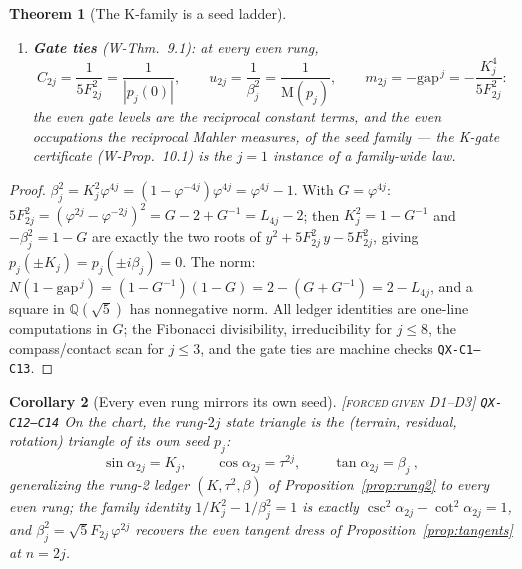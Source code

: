 \documentclass[11pt]{article}
\newcommand{\tagFD}{\textcolor{cF}{\textsc{[forced}}\,\textcolor{cD}{\textsc{given D1--D3]}}}
\newcommand{\hx}[1]{\textcolor{cC}{\footnotesize\texttt{#1}}}
\newcommand{\Q}{\mathbb{Q}}
\newcommand{\gp}{\varphi}
\newcommand{\gapc}{\mathrm{gap}}
\newcommand{\M}{\mathrm{M}}
\theoremstyle{plain}
\newtheorem{theorem}{Theorem}[section]
\newtheorem{corollary}[theorem]{Corollary}
\theoremstyle{definition}
\theoremstyle{remark}
\begin{document}
\begin{theorem}[The K-family is a seed ladder]
\begin{enumerate}[nosep,label=(\alph*)]
$\{\Phi_1^4,\Phi_2^4\}$ (the eight cross-shell ratios have modulus
$(K_j/\beta_j)^{\pm1}\ne1$); and $\M(p_j)=\beta_j^2$: every $p_j$ is a
straddler, real pair strictly inside the unit circle, imaginary pair
strictly outside. (The K-seed's own catalog status is
Proposition~\ref{prop:kseedcat}; the $p_j$, $j\ge2$, are new catalog
objects, and no uniqueness is claimed for them here.)
\item \textbf{Gate ties} (W-Thm.\ 9.1): at every even rung,
\[
C_{2j}=\frac1{5F_{2j}^2}=\frac1{|p_j(0)|},
\qquad
u_{2j}=\frac1{\beta_j^2}=\frac1{\M(p_j)},
\qquad
m_{2j}=-\gapc^{\,j}=-\frac{K_j^4}{5F_{2j}^2}:
\]
the even gate levels are the reciprocal constant terms, and the even
occupations the reciprocal Mahler measures, of the seed family --- the
K-gate certificate (W-Prop.\ 10.1) is the $j=1$ instance of a family-wide
law.
\end{enumerate}
\end{theorem}

\begin{proof}
$\beta_j^2=K_j^2\gp^{4j}=(1-\gp^{-4j})\gp^{4j}=\gp^{4j}-1$. With
$G=\gp^{4j}$: $5F_{2j}^2=(\gp^{2j}-\gp^{-2j})^2=G-2+G^{-1}=L_{4j}-2$;
then $K_j^2=1-G^{-1}$ and $-\beta_j^2=1-G$ are exactly the two roots of
$y^2+5F_{2j}^2\,y-5F_{2j}^2$, giving $p_j(\pm K_j)=p_j(\pm i\beta_j)=0$.
The norm: $N(1-\gapc^{\,j})=(1-G^{-1})(1-G)=2-(G+G^{-1})=2-L_{4j}$, and a
square in $\Q(\sqrt5)$ has nonnegative norm. All ledger identities are
one-line computations in $G$; the Fibonacci divisibility, irreducibility
for $j\le8$, the compass/contact scan for $j\le3$, and the gate ties are
machine checks \hx{QX-C1--C13}.
\end{proof}

\begin{corollary}[Every even rung mirrors its own seed]\label{cor:evenmirror}\tagFD{} \hx{QX-C12--C14}
On the chart, the rung-$2j$ state triangle is the (terrain, residual,
rotation) triangle of its \emph{own} seed $p_j$:
\[
\sin\alpha_{2j}=K_j,\qquad \cos\alpha_{2j}=\tau^{2j},\qquad
\boxed{\ \tan\alpha_{2j}=\beta_j\ },
\]
generalizing the rung-2 ledger $(K,\tau^2,\beta)$ of
Proposition~\ref{prop:rung2} to every even rung; the family identity
$1/K_j^2-1/\beta_j^2=1$ is exactly
$\csc^2\alpha_{2j}-\cot^2\alpha_{2j}=1$, and
$\beta_j^2=\sqrt5F_{2j}\,\gp^{2j}$ recovers the even tangent dress of
Proposition~\ref{prop:tangents} at $n=2j$.
\end{corollary}
\end{document}
